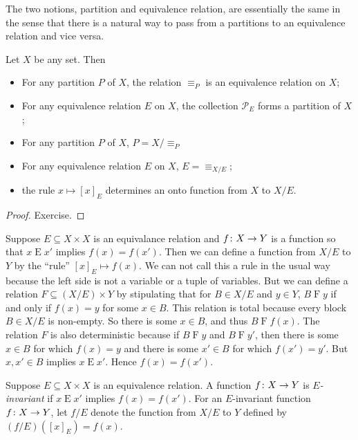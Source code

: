 The two notions, partition and equivalence relation, are essentially the same in the sense that there is a natural way to pass from a partitions to an equivalence relation and vice versa.

\begin{lemma}
	Let $X$ be any set. Then
	\begin{itemize}
		\item For any partition $P$ of $X$, the relation $\equiv_P$ is an equivalence relation on $X$;
		\item For any equivalence relation $E$ on $X$, the collection ${\mathcal P}_E$ forms a partition of $X$;
		\item For any partition $P$ of $X$, $P = X/{\equiv_P}$
		\item For any equivalence relation $E$ on $X$, $E = \equiv_{X/E}$;
		\item the rule $x\mapsto [x]_E$ determines an onto function from $X$ to $X/E$.
	\end{itemize} 

	\begin{proof}
		Exercise.
	\end{proof} 
\end{lemma}

Suppose $E\subseteq X\times X$ is an equivalance relation and ${f}\colon{X}\to{Y}$ 
is a function so that $x\mathrel{E}x'$ implies $f(x)=f(x')$. 
Then we can define a function from $X/E$ to $Y$ by the ``rule'' $[x]_E \mapsto f(x)$.
We can not call this a rule in the usual way because the left side is not a variable or a tuple of variables. 
But we can define a relation $F\subseteq (X/E)\times Y$ by stipulating that for $B\in X/E$ and $y\in Y$, $B\mathrel{F}y$ if and only if $f(x)=y$ for some $x\in B$. 
This relation is total because every block $B\in X/E$ is non-empty. 
So there is some $x\in B$, and thus $B\mathrel{F}f(x)$.
The relation $F$ is also deterministic because if $B\mathrel{F}y$ and $B\mathrel{F}y'$, then there is some $x\in B$ for which $f(x)=y$ and there is some $x'\in B$ for which $f(x')=y'$. 
But $x,x'\in B$ implies $x\mathrel{E}x'$.
Hence $f(x)=f(x')$.

\begin{defn}
	Suppose $E\subseteq X\times X$ is an equivalence relation. 
	A function ${f}\colon{X}\to{Y}$ is \emph{$E$-invariant} if $x\mathrel{E}x'$ implies $f(x)=f(x')$.
	For an $E$-invariant function ${f}\colon{X}\to{Y}$, let $f/E$ denote the function 
	from $X/E$ to $Y$ defined by $(f/E)([x]_E) = f(x)$.
\end{defn}

